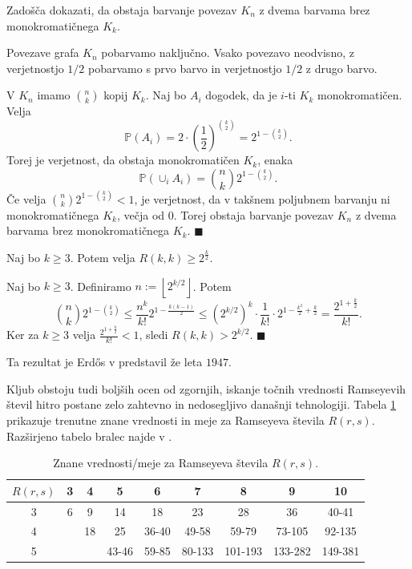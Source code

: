 \documentclass[twoside,11pt]{article}
\providecommand{\floor}[1]{\left\lfloor #1\right\rfloor}
\begin{document}
\begin{dokaz}
    Zadošča dokazati, da obstaja barvanje povezav $K_n$ z dvema barvama
    brez monokromatičnega $K_k$.

    Povezave grafa $K_n$ pobarvamo naključno. Vsako povezavo 
    neodvisno, z verjetnostjo $1/2$ pobarvamo s prvo barvo in 
    verjetnostjo $1/2$ z drugo barvo.
    
    V $K_n$ imamo $\binom{n}{k}$ kopij $K_k$. Naj bo $A_i$ dogodek, da 
    je $i$-ti $K_k$ monokromatičen. Velja
    \[
        \mathbb{P}(A_i) = 2 \cdot \left(\frac{1}{2}\right)^{\binom{k}{2}} = 
        2^{1-\binom{k}{2}}.
    \]
    Torej je verjetnost, da obstaja monokromatičen $K_k$, enaka 
    \[
        \mathbb{P}\left(\cup_iA_i\right) = \binom{n}{k}2^{1-\binom{k}{2}}.
    \]
    Če velja $\binom{n}{k}2^{1-\binom{k}{2}} < 1$, je verjetnost, da v 
    takšnem poljubnem barvanju ni monokromatičnega $K_k$, večja od $0$.
    Torej obstaja barvanje povezav $K_n$ z dvema barvama brez 
    monokromatičnega $K_k$. \hfill $\blacksquare$
\end{dokaz}

\begin{posledica}
    Naj bo $k \ge 3$. Potem velja $R(k, k) \ge 2^\frac{k}{2}$.
\end{posledica}

\begin{dokaz}
    Naj bo $k \ge 3$. Definiramo $n:=\floor{2^{k/2}}$. Potem
    \[
        \binom{n}{k}2^{1-\binom{k}{2}} \le
        \frac{n^k}{k!}2^{1-\frac{k(k-1)}{2}} \le 
        \left(2^{k/2}\right)^k \cdot \frac{1}{k!} \cdot 2^{1-\frac{k^2}{2}+\frac{k}{2}} =
        \frac{2^{1+\frac{k}{2}}}{k!}.
    \]
    Ker za $k \ge 3$ velja $\frac{2^{1+\frac{k}{2}}}{k!} < 1$, sledi $R(k, k) > 2^{k/2}$. \hfill $\blacksquare$
\end{dokaz}

Ta rezultat je Erdős v \cite{erdos} predstavil že leta $1947$.

Kljub obstoju tudi boljših ocen od zgornjih,
iskanje točnih vrednosti Ramseyevih števil hitro postane zelo zahtevno in 
nedosegljivo današnji tehnologiji. Tabela \ref{tab:meje} prikazuje 
trenutne znane vrednosti in meje za Ramseyeva števila $R(r, s)$. 
Razširjeno tabelo bralec najde v \cite{wiki}.

\begin{table}[H]
    \centering
    \begin{tabular}{|c||c|c|c|c|c|c|c|c|}\hline
    $R(r,s)$ & 3 & 4  & 5     & 6     & 7     & 8     & 9       & 10     \\\hline \hline
    3 & 6 & 9  & 14    & 18    & 23    & 28    & 36      & 40-41  \\\hline
    4 &   & 18 & 25    & 36-40 & 49-58 & 59-79 & 73-105 & 92-135 \\\hline
    5 &   &    & 43-46 & 59-85 & 80-133 & 101-193 & 133-282 & 149-381\\\hline
    \end{tabular}
    \caption{Znane vrednosti/meje za Ramseyeva števila $R(r, s)$.}
    \label{tab:meje}
\end{table}
\end{document}
